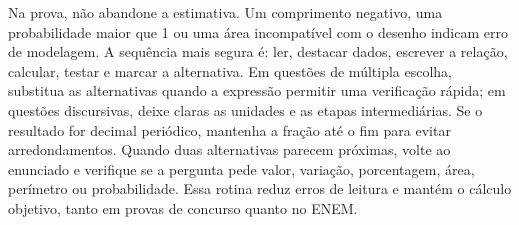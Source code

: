 \documentclass[11pt,a4paper]{article}
\begin{document}
Na prova, não abandone a estimativa. Um comprimento negativo, uma probabilidade maior que 1 ou uma área incompatível com o desenho indicam erro de modelagem. A sequência mais segura é: ler, destacar dados, escrever a relação, calcular, testar e marcar a alternativa. Em questões de múltipla escolha, substitua as alternativas quando a expressão permitir uma verificação rápida; em questões discursivas, deixe claras as unidades e as etapas intermediárias. Se o resultado for decimal periódico, mantenha a fração até o fim para evitar arredondamentos. Quando duas alternativas parecem próximas, volte ao enunciado e verifique se a pergunta pede valor, variação, porcentagem, área, perímetro ou probabilidade. Essa rotina reduz erros de leitura e mantém o cálculo objetivo, tanto em provas de concurso quanto no ENEM.
\end{document}
